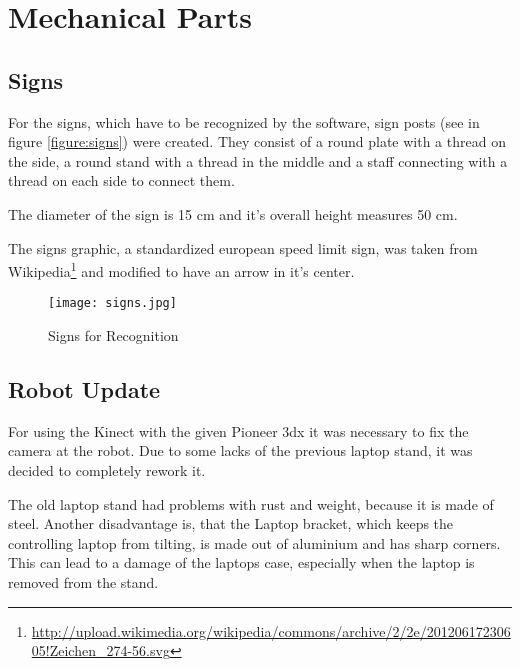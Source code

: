 \chapter{Mechanical Parts}
\graphicspath{{./Mechanical/img/}}



\section{Signs}

For the signs, which have to be recognized by the software, sign posts (see in figure \vref{figure:signs}) were created.
They consist of a round plate with a thread on the side, a round stand with a thread in the middle and a staff connecting
with a thread on each side to connect them.

The diameter of the sign is 15 cm and it's overall height measures 50 cm.

The signs graphic, a standardized european speed limit sign, was taken from 
Wikipedia\footnote{\url{http://upload.wikimedia.org/wikipedia/commons/archive/2/2e/20120617230605!Zeichen_274-56.svg}}
and modified to have an arrow in it's center. 

 \begin{figure}[htp]
\begin{center}
  \texttt{[image: signs.jpg]}
  \caption{Signs for Recognition}
  \label{figure:signs}
\end{center}
\end{figure}

\section{Robot Update}

For using the Kinect with the given Pioneer 3dx it was necessary to fix the camera at the robot.
Due to some lacks of the previous laptop stand, it was decided to completely rework it.

The old laptop stand had problems with rust and weight,
because it is made of steel. Another disadvantage is, that the Laptop bracket, which keeps the 
controlling laptop from tilting, is made out of aluminium and has sharp corners. This can lead
to a damage of the laptops case, especially when the laptop is removed from the stand. 

